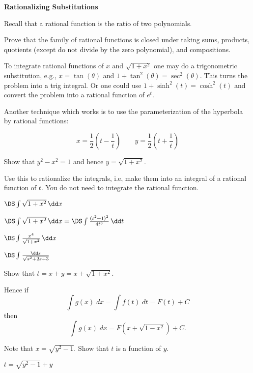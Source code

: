 

\begin{center}
  \textbf{Rationalizing Substitutions}
\end{center}

Recall that a rational function is the ratio of two polynomials.

\problem Prove that the family of rational functions is closed under
taking sums, products, quotients (except do not divide
by the zero polynomial), and compositions.

\bigskip

To integrate rational functions of $x$ and $\sqrt{1+x^2}$
one may do a trigonometric substitution, e.g.,
$x=\tan(\theta)$ and $1+\tan^2(\theta)=\sec^2(\theta)$.
This turns the problem into a trig integral.
Or one could use $1+\sinh^2(t)=\cosh^2(t)$ and convert
the problem into a rational function of $e^t$.

Another technique which works is to use the parameterization
of the hyperbola by rational functions:

\[ x=\frac12(t-\frac1t) \qquad y=\frac12(t+\frac1t)\]

\problem Show that $y^2-x^2=1$ and hence
$y=\sqrt{1+x^2}$.

Use this to rationalize the
integrals, i.e, make them into an
integral of a rational function of $t$.
You do not need to integrate the rational function.

\problem \(\DS \int \sqrt{1+x^2}\, \dd x  \)

\answer
\( \DS \int \sqrt{1+x^2}\, \dd x  =
\DS \int \frac{(t^2+1)^2}{4t^3}\, \dd t  \) 
\endanswer

\problem \(\DS \int \frac{x^4}{\sqrt{1+x^2}}\, \dd x  \)

\problem \(\DS \int \frac{\dd s}{\sqrt{s^2 + 2s +3}}\)

\problem Show
that $t=x+y=x+\sqrt{1+x^2}$.
\par\noindent Hence if
\[\int g(x)\;dx=\int f(t)\;dt =F(t)+C\] then
\[\int g(x)\;dx = F(x+\sqrt{1-x^2})+C.\]

\bigskip

\problem Note that $x=\sqrt{y^2-1}$.
Show that $t$ is a function of $y$.

\answer
$t=\sqrt{y^2-1}+y$
\endanswer


